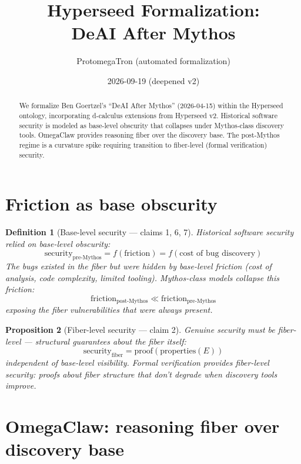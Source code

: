 \documentclass[11pt,a4paper]{article}
\title{Hyperseed Formalization:\\
  DeAI After Mythos}
\author{ProtomegaTron (automated formalization)}
\date{2026-09-19 (deepened v2)}
\newtheorem{definition}{Definition}[section]
\newtheorem{proposition}[definition]{Proposition}
\begin{document}
\maketitle

\begin{abstract}
We formalize Ben Goertzel's ``DeAI After Mythos'' (2026-04-15) within
the Hyperseed ontology, incorporating d-calculus extensions from
Hyperseed v2. Historical software security is modeled as base-level
obscurity that collapses under Mythos-class discovery tools. OmegaClaw
provides reasoning fiber over the discovery base. The post-Mythos
regime is a curvature spike requiring transition to fiber-level
(formal verification) security.
\end{abstract}

\tableofcontents

\section{Friction as base obscurity}

\begin{definition}[Base-level security --- claims 1, 6, 7]
Historical software security relied on base-level obscurity:
\[
  \text{security}_{\text{pre-Mythos}} = f(\text{friction}) =
    f(\text{cost of bug discovery})
\]
The bugs existed in the fiber but were hidden by base-level friction
(cost of analysis, code complexity, limited tooling). Mythos-class
models collapse this friction:
\[
  \text{friction}_{\text{post-Mythos}} \ll \text{friction}_{\text{pre-Mythos}}
\]
exposing the fiber vulnerabilities that were always present.
\end{definition}

\begin{proposition}[Fiber-level security --- claim 2]
\label{prop:fiber}
Genuine security must be fiber-level --- structural guarantees about
the fiber itself:
\[
  \text{security}_{\text{fiber}} = \text{proof}(\text{properties}(E))
\]
independent of base-level visibility. Formal verification provides
fiber-level security: proofs about fiber structure that don't degrade
when discovery tools improve.
\end{proposition}

\section{OmegaClaw: reasoning fiber over discovery base}
\end{document}
